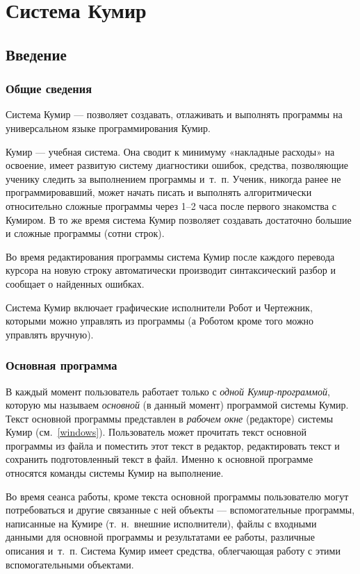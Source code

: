 \chapter{Система Кумир}

\section{Введение}
\subsection{Общие сведения}

Система Кумир --- позволяет создавать, отлаживать и выполнять программы на универсальном языке программирования Кумир.

Кумир --- учебная система. Она сводит к минимуму «накладные расходы» на освоение, имеет развитую систему диагностики ошибок, средства, позволяющие ученику следить за выполнением программы и~т.~п. Ученик, никогда ранее не программировавший, может начать писать и выполнять алгоритмически относительно сложные программы через 1--2 часа после первого знакомства с Кумиром. В то же время система Кумир позволяет создавать достаточно большие и сложные программы (сотни строк).

Во время редактирования программы система Кумир после каждого перевода курсора на новую строку автоматически производит синтаксический разбор и сообщает о найденных ошибках.

Система Кумир включает графические исполнители Робот и Чертежник, которыми можно управлять из программы (а Роботом кроме того можно управлять вручную). 

\subsection{Основная программа}

В каждый момент пользователь работает только с \emph{одной Кумир-программой}, которую мы называем \emph{основной} (в данный момент) программой системы Кумир. Текст основной программы представлен в \emph{рабочем окне} (редакторе) системы Кумир (см.~\ref{windows}). Пользователь может прочитать текст основной программы из файла и поместить этот текст в редактор, редактировать текст и сохранить подготовленный текст в файл. Именно к основной программе относятся команды системы Кумир на выполнение.

Во время сеанса работы, кроме текста основной программы пользователю могут потребоваться и другие связанные с ней объекты --- вспомогательные программы, написанные на Кумире (т.~н.~внешние исполнители), файлы с входными данными для основной программы и результатами ее работы, различные описания и~т.~п. Система Кумир имеет средства, облегчающая работу с этими вспомогательными объектами. 

